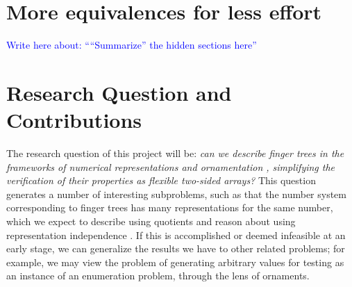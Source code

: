 \documentclass{article}
\theoremstyle{plain}%
\theoremstyle{definition}
\newcommand{\towrite}[1]{\par\textcolor{blue}{Write here about: ``#1''}\par}
\begin{document}
\section{More equivalences for less effort}\label{sec:userfriendly}
\towrite{``Summarize'' the hidden sections here}
%


\section{Research Question and Contributions}\label{sec:research-question}
The research question of this project will be: \textit{can we describe finger trees \cite{fingertrees} in the frameworks of numerical representations and ornamentation \cite{progorn}, simplifying the verification of their properties as flexible two-sided arrays?} This question generates a number of interesting subproblems, such as that the number system corresponding to finger trees has many representations for the same number, which we expect to describe using quotients \cite{cuagda} and reason about using representation independence \cite{iri}. If this is accomplished or deemed infeasible at an early stage, we can generalize the results we have to other related problems; for example, we may view the problem of generating arbitrary values for testing as an instance of an enumeration problem, through the lens of ornaments.
\end{document}
